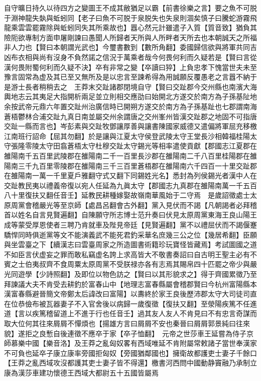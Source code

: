 自守曠日持久以待四方之變圖王不成其敝猶足以霸【前書徐樂之言】要之魚不可脱于淵神龍失埶與蚯蚓同【老子曰魚不可脱于泉脱失也失泉則涸矣慎子曰騰蛇游霧飛龍乘雲雲罷霧除與蚯蚓同失其所乘故也】囂心然元計雖遣子入質【質音致】猶負其險阨欲專制方面申屠剛諫曰愚聞人所歸者天所與人所畔者天所去也本朝誠天之所福非人力也【賢曰本朝謂光武也】今璽書數到【數所角翻】委國歸信欲與將軍共同吉凶布衣相與尚有沒身不負然諾之信況于萬乘者哉今何畏何利而久疑若是【賢曰言從漢何畏附蜀何利而久疑不決】卒有非常之變【卒讀曰猝】上負忠孝下愧當世夫未至豫言固常為虚及其已至又無所及是以忠言至諫希得為用誠願反覆愚老之言囂不納于是游士長者稍稍去之　王莽末交趾諸郡閉境自守【賢曰交趾郡今交州縣也南濱大海輿地志云其夷足大指開析兩足並立則相交應劭曰始開北方遂交於南方為子孫基阯地余按武帝元鼎六年置交趾州治廣信時已開朔方遂交於南方為子孫基趾也七郡謂南海蒼梧鬱林合浦交趾九真日南並屬交州余謂唐之交州峯州皆漢交趾郡之地固不可指唐交趾一縣而言也】岑彭素與交趾牧鄧讓厚善與讓書陳國家威德又遣偏將軍屈充移檄江南班行詔命【屈其勿翻】於是讓與江夏太守侯登武陵太守王堂長沙相韓福桂陽太守張隆零陵太守田翕蒼梧太守杜穆交趾太守錫光等相率遣使貢獻【郡國志江夏郡在雒陽南千五百里武陵郡在雒陽南二千一百里長沙郡在雒陽南二千八百里桂陽郡在雒陽南三千九百里零陵郡在雒陽南三千三百里蒼梧郡在雒陽南六千四百一十里交趾郡在雒陽南一萬一千里夏戶雅翻守式又翻下同錫姓光名】悉封為列侯錫光者漢中人在交趾教民夷以禮義帝復以宛人任延為九眞太守【郡國志九真郡在雒陽南萬一千五百八十里復扶又翻任音壬】延教民耕種嫁娶故嶺南華風始于二守焉　是歲詔徵處士太原周黨會稽嚴光等至京師【處昌呂翻會古外翻】黨入見伏而不謁【凡朝謁者必拜稽首以姓名自言見賢遍翻】自陳願守所志博士范升奏曰伏見太原周黨東海王良山陽王成等蒙受厚恩使者三聘乃肯就車及陛見帝廷【見賢遍翻】黨不以禮屈伏而不謁偃蹇驕悍同時俱逝黨等文不能演義武不能死君釣采華名庶幾三公之位【幾居希翻】臣願與坐雲臺之下【續漢志曰雲臺周家之所造圖書術籍珍玩寶怪皆藏焉】考試圖國之道不如臣言伏虚妄之罪而敢私竊虚名誇上求高皆大不敬書奏詔曰自古明王聖主必有不賓之士伯夷叔齊不食周粟太原周黨不受朕禄亦各有志焉其賜帛四十匹罷之帝少與嚴光同遊學【少詩照翻】及即位以物色訪之【賢曰以其形貌求之】得于齊國累徵乃至拜諫議大夫不肯受去耕釣於富春山中【地理志富春縣屬會稽郡賢曰今杭州富陽縣本漢富春縣避晉簡文帝鄭太后諱改曰富陽】以夀終於家王良後歷沛郡太守大司徒司直在位恭儉布被瓦器妻子不入官舍後以病歸一歲復徵【復扶又翻】至滎陽疾篤不任進道【言以疾篤稽留道上不進于行也任音壬】過其友人友人不肯見曰不有忠言奇謀而取大位何其往來屑屑不憚煩也【揚雄方言曰屑屑不安也秦晉曰屑屑郭景純曰往來貌】遂拒之良慙自後連徵不應卒于家【卒子恤翻】　元帝之世莎車王延嘗為侍子京師慕樂中國【樂音洛】及王莽之亂匈奴畧有西域唯延不肯附屬常敕諸子當世奉漢家不可負也延卒子康立康率旁國拒匈奴【旁國猶鄰國也】擁衛故都護吏士妻子千餘口【王莽之亂西域攻沒都護其吏士妻子皆不得還】檄書河西問中國動静竇融乃承制立康為漢莎車建功懷德王西域大都尉五十五國皆屬焉

